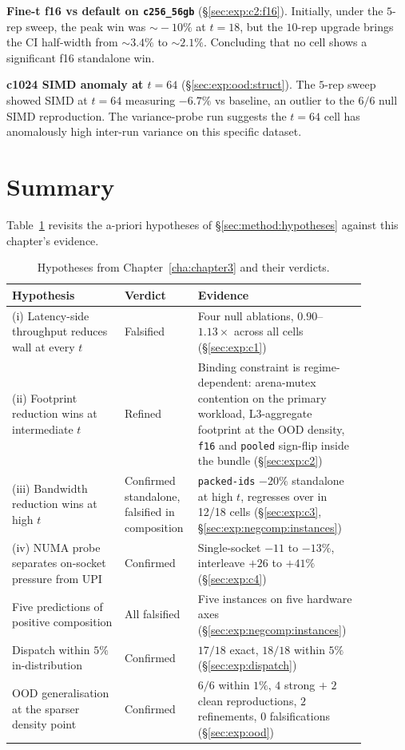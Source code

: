 \textbf{Fine-t f16 vs default on \texttt{c256\_56gb}} (§\ref{sec:exp:c2:f16}). Initially, under the $5$-rep sweep, the peak win was $\sim\!-10\%$ at $t{=}18$, but the $10$-rep upgrade brings the CI half-width from $\sim\!3.4\%$ to $\sim\!2.1\%$. Concluding that no cell shows a significant f16 standalone win.

\textbf{c1024 SIMD anomaly at $t{=}64$} (§\ref{sec:exp:ood:struct}). The $5$-rep sweep showed SIMD at $t{=}64$ measuring $-6.7\%$ vs baseline, an outlier to the $6/6$ null SIMD reproduction. The variance-probe run suggests the $t{=}64$ cell has anomalously high inter-run variance on this specific dataset.

\section{Summary\label{sec:exp:summary}}

Table~\ref{tab:exp:hyp_verdicts} revisits the a-priori hypotheses of §\ref{sec:method:hypotheses} against this chapter's evidence.

\begin{table}[H]
  \centering
  \caption[Hypotheses and their verdicts.]{Hypotheses from Chapter~\ref{cha:chapter3} and their verdicts.}
  \label{tab:exp:hyp_verdicts}
  \footnotesize
  \begin{tabular}{>{\raggedright\arraybackslash}p{0.30\linewidth}>{\raggedright\arraybackslash}p{0.16\linewidth}>{\raggedright\arraybackslash}p{0.42\linewidth}}
    \toprule
    Hypothesis & Verdict & Evidence \\
    \midrule
    (i) Latency-side throughput reduces wall at every $t$ & Falsified & Four null ablations, $0.90$--$1.13\times$ across all cells (§\ref{sec:exp:c1}) \\
    (ii) Footprint reduction wins at intermediate $t$ & Refined & Binding constraint is regime-dependent: arena-mutex contention on the primary workload, L3-aggregate footprint at the OOD density, \texttt{f16} and \texttt{pooled} sign-flip inside the bundle (§\ref{sec:exp:c2}) \\
    (iii) Bandwidth reduction wins at high $t$ & Confirmed standalone, falsified in composition & \texttt{packed-ids} $-20\%$ standalone at high $t$, regresses over \bcombo{} in 12/18 cells (§\ref{sec:exp:c3}, §\ref{sec:exp:negcomp:instances}) \\
    (iv) NUMA probe separates on-socket pressure from UPI & Confirmed & Single-socket $-11$ to $-13\%$, interleave $+26$ to $+41\%$ (§\ref{sec:exp:c4}) \\
    Five predictions of positive composition & All falsified & Five instances on five hardware axes (§\ref{sec:exp:negcomp:instances}) \\
    Dispatch within $5\%$ in-distribution & Confirmed & $17/18$ exact, $18/18$ within $5\%$ (§\ref{sec:exp:dispatch}) \\
    OOD generalisation at the sparser density point & Confirmed & $6/6$ within $1\%$, $4$ strong $+$ $2$ clean reproductions, $2$ refinements, $0$ falsifications (§\ref{sec:exp:ood}) \\
    \bottomrule
  \end{tabular}
\end{table}

